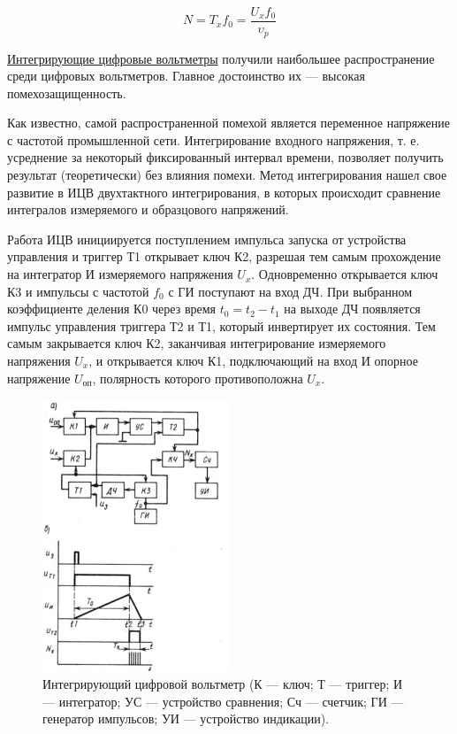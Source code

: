 \documentclass[unicode, 12pt, a4paper, oneside]{article}
\begin{document}
\begin{displaymath}
N = T_x f_0 = \frac{U_x f_0}{\upsilon_p}
\end{displaymath}

\underline{Интегрирующие цифровые вольтметры} получили наибольшее распространение среди цифровых вольтметров. Главное достоинство их — высокая помехозащищенность.

Как известно, самой распространенной помехой является переменное напряжение с частотой промышленной сети.
Интегрирование входного напряжения, т. е. усреднение за некоторый фиксированный интервал времени, позволяет получить результат (теоретически) без влияния помехи. Метод интегрирования нашел свое развитие в ИЦВ двухтактного интегрирования, в которых происходит сравнение интегралов измеряемого и образцового напряжений.

Работа ИЦВ инициируется поступлением импульса запуска от устройства управления и триггер Т1 открывает ключ К2, разрешая тем самым прохождение на интегратор И измеряемого напряжения $U_x$. Одновременно открывается ключ К3 и импульсы с частотой $f_0$ с ГИ поступают на вход ДЧ. При выбранном коэффициенте деления К0 через время $t_0 = t_2 - t_1$ на выходе ДЧ появляется импульс управления триггера Т2 и Т1, который инвертирует их состояния. Тем самым закрывается ключ К2, заканчивая интегрирование измеряемого напряжения $U_x$, и открывается ключ К1, подключающий на вход И опорное напряжение ${U_\text{оп}}$, полярность которого противоположна $U_x$.

\begin{figure}[H]
\centering
\includegraphics[width=0.5\textwidth]{55_2.jpg}
\caption{Интегрирующий цифровой вольтметр (К — ключ; Т — триггер; И — интегратор; УС — устройство сравнения; Сч — счетчик; ГИ — генератор импульсов; УИ — устройство индикации).}
\end{figure}
\end{document}

